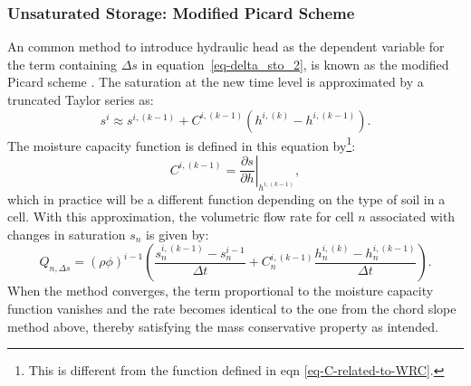 \documentclass[fleqn]{article}
\begin{document}
\subsubsection*{Unsaturated Storage: Modified Picard Scheme}
An common method to introduce hydraulic head as the dependent
variable for the term containing $\Delta s$ in 
equation~\ref{eq-delta_sto_2}, is known as the modified Picard
scheme \cite{celia-1990}. The saturation at the new time
level is approximated by a truncated Taylor series as:
\begin{equation}
  s^i \approx s^{i,(k-1)} + 
  C^{i,(k-1)}
  \left( h^{i,(k)} - h^{i,(k-1)} \right).
  \label{eq-celia-taylor}
\end{equation}
The moisture capacity function is defined in this equation by\footnote{{\color{purple}This is different from the function defined in eqn \ref{eq-C-related-to-WRC}.}}:
\begin{equation}
  C^{i,(k-1)} = 
  \left. \frac{\partial s}{\partial h}\right|_{h^{i,(k-1)}},
  \label{eq-celia-moisture-cap-fun}
\end{equation}
which in practice will be a different function depending on
the type of soil in a cell. With this approximation, the volumetric
flow rate for cell $n$ associated with changes in saturation $s_n$ is
given by:
\begin{equation}
  Q_{n,\Delta s} = (\rho \phi)^{i-1}
  \left( 
  \frac{s_n^{i,(k-1)} - s_n^{i-1}}{\Delta t} +
  C_n^{i,(k-1)}
  \frac{h_n^{i,(k)} - h_n^{i,(k-1)}}{\Delta t}
  \right).
\end{equation}
When the method converges, the term proportional to the moisture
capacity function vanishes and the rate becomes identical to the
one from the chord slope method above, thereby satisfying the mass 
conservative property as intended.
\end{document}
